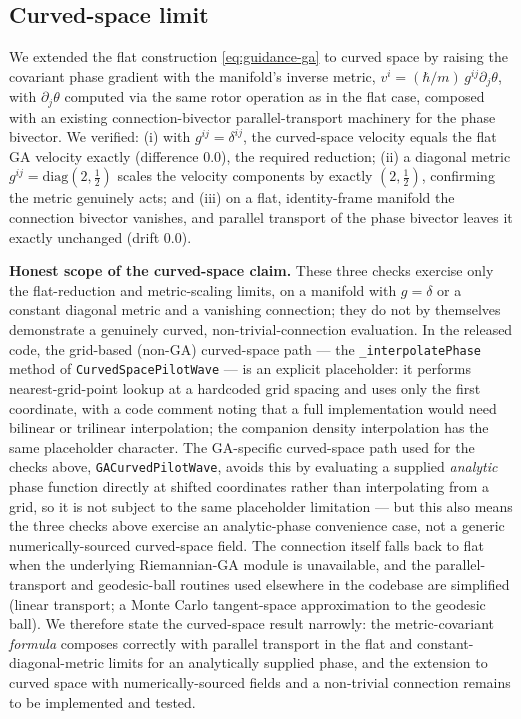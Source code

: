 \documentclass[11pt]{article}
\begin{document}
\subsection{Curved-space limit}

We extended the flat construction \eqref{eq:guidance-ga} to curved space by raising the covariant phase gradient with the manifold's inverse metric, $v^i=(\hbar/m)\,g^{ij}\partial_j \theta$, with $\partial_j \theta$ computed via the same rotor operation as in the flat case, composed with an existing connection-bivector parallel-transport machinery for the phase bivector. We verified: (i) with $g^{ij}=\delta^{ij}$, the curved-space velocity equals the flat GA velocity exactly (difference $0.0$), the required reduction; (ii) a diagonal metric $g^{ij}=\mathrm{diag}(2,\tfrac12)$ scales the velocity components by exactly $(2,\tfrac12)$, confirming the metric genuinely acts; and (iii) on a flat, identity-frame manifold the connection bivector vanishes, and parallel transport of the phase bivector leaves it exactly unchanged (drift $0.0$).

\textbf{Honest scope of the curved-space claim.} These three checks exercise only the flat-reduction and metric-scaling limits, on a manifold with $g=\delta$ or a constant diagonal metric and a vanishing connection; they do not by themselves demonstrate a genuinely curved, non-trivial-connection evaluation. In the released code, the grid-based (non-GA) curved-space path — the \texttt{\_interpolatePhase} method of \texttt{CurvedSpacePilotWave} — is an explicit placeholder: it performs nearest-grid-point lookup at a hardcoded grid spacing and uses only the first coordinate, with a code comment noting that a full implementation would need bilinear or trilinear interpolation; the companion density interpolation has the same placeholder character. The GA-specific curved-space path used for the checks above, \texttt{GACurvedPilotWave}, avoids this by evaluating a supplied \emph{analytic} phase function directly at shifted coordinates rather than interpolating from a grid, so it is not subject to the same placeholder limitation — but this also means the three checks above exercise an analytic-phase convenience case, not a generic numerically-sourced curved-space field. The connection itself falls back to flat when the underlying Riemannian-GA module is unavailable, and the parallel-transport and geodesic-ball routines used elsewhere in the codebase are simplified (linear transport; a Monte Carlo tangent-space approximation to the geodesic ball). We therefore state the curved-space result narrowly: the metric-covariant \emph{formula} composes correctly with parallel transport in the flat and constant-diagonal-metric limits for an analytically supplied phase, and the extension to curved space with numerically-sourced fields and a non-trivial connection remains to be implemented and tested.
\end{document}
